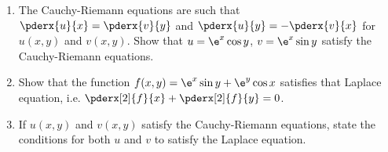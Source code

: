 \begin{problem}
    \begin{enumerate}
        \item The Cauchy-Riemann equations are such that $\pderx{u}{x} = \pderx{v}{y}$ and $\pderx{u}{y} = -\pderx{v}{x}$ for $u(x, y)$ and $v(x, y)$. Show that $u = \e^x \cos y$, $v = \e^x \sin y$ satisfy the Cauchy-Riemann equations.
        \item Show that the function $f(x, y) = \e^x \sin y + \e^y \cos x$ satisfies that Laplace equation, i.e. $\pderx[2]{f}{x} + \pderx[2]{f}{y} = 0$.
        \item If $u(x, y)$ and $v(x, y)$ satisfy the Cauchy-Riemann equations, state the conditions for both $u$ and $v$ to satisfy the Laplace equation.
    \end{enumerate}
\end{problem}
